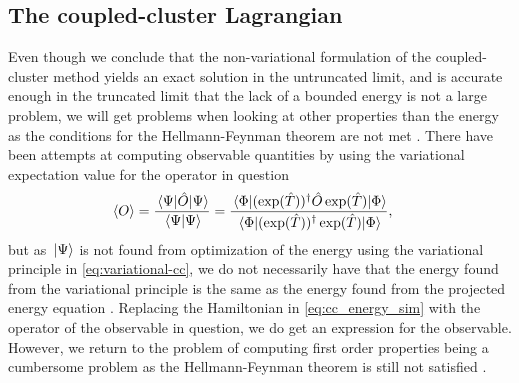 
        \subsection{The coupled-cluster Lagrangian}
            Even though we conclude that the non-variational formulation of
            the coupled-cluster method yields an exact solution in the
            untruncated limit, and is accurate enough in the truncated limit
            that the lack of a bounded energy is not a large problem,
            we will get problems when looking at other properties than the
            energy as the conditions for the Hellmann-Feynman theorem are not
            met \cite{helgaker-molecular}.
            There have been attempts at computing observable quantities by using
            the variational expectation value for the operator in question
            \cite{exp-value-cizek, fink1974163}
            \begin{align}
                \expval{O}
                &= \frac{\mel*{\Psi}{\hat{O}}{\Psi}}{\braket*{\Psi}{\Psi}}
                = \frac{
                    \mel*{\slat}{
                        (\exponential(\clust))^{\dagger}
                        \hat{O}
                        \exponential(\clust)
                    }{\slat}
                }{
                    \mel*{\slat}{
                        (\exponential(\clust))^{\dagger}
                        \exponential(\clust)
                    }{\slat}
                },
            \end{align}
            but as $\ket*{\Psi}$ is not found from optimization of the energy
            using the variational principle in \autoref{eq:variational-cc}, we
            do not necessarily have that the energy found from the variational
            principle is the same as the energy found from the projected energy
            equation \cite{kvaal2013variational}.
            Replacing the Hamiltonian in \autoref{eq:cc_energy_sim} with the
            operator of the observable in question, we do get an expression for
            the observable.
            However, we return to the problem of computing first order
            properties being a cumbersome problem as the Hellmann-Feynman
            theorem is still not satisfied \cite{helgaker-molecular,
            kvaal2013variational}.


